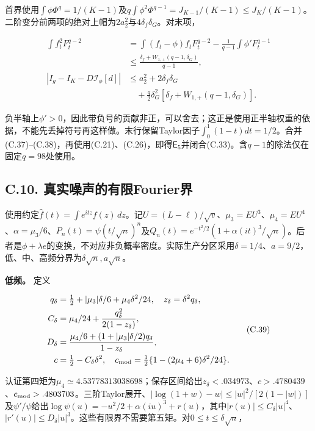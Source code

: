 \documentclass[11pt,a4paper]{article}
\begin{document}
首界使用\(\int\phi\Phi^q=1/(K-1)\)及\(q\int\phi^2\Phi^{q-1}=J_{K-1}/(K-1)\le J_K/(K-1)\)。二阶变分前两项的绝对上帽为\(2a_2^2\)与\(4\delta_f\delta_G\)。对末项，

\[
\begin{aligned}
\int f_t^2F_t^{q-2}
&=\int(f_t-\phi)f_tF_t^{q-2}-\frac1{q-1}\int\phi'F_t^{q-1}\\
&\le\frac{\delta_f+W_{1,+}(q-1,\delta_G)}{q-1},\\
|I_g-I_K-D\mathcal I_\phi[d]|
&\le a_2^2+2\delta_f\delta_G\\
&\quad+\frac q2\delta_G^2[\delta_f+W_{1,+}(q-1,\delta_G)].
\end{aligned}
\tag{C.38}
\]

负半轴上\(\phi'>0\)，因此带负号的贡献非正，可以舍去；这正是使用正半轴权重的依据，不能先丢掉符号再这样做。末行保留Taylor因子\(\int_0^1(1-t)dt=1/2\)。合并(C.37)--(C.38)，再使用(C.21)、(C.26)，即得\(\mathsf E_5\)并闭合(C.33)。含\(q-1\)的除法仅在固定\(q=98\)处使用。

\subsection*{C.10.
真实噪声的有限Fourier界}\label{c.10.-ux771fux5b9eux566aux58f0ux7684ux6709ux9650fourierux754c}

使用约定\(\widehat f(t)=\int e^{itz}f(z)\,dz\)。记\(U=(L-\ell)/\sqrt v\)、\(\mu_3=EU^3\)、\(\mu_4=EU^4\)、\(\alpha=\mu_3/6\)、\(P_n(t)=\psi(t/\sqrt n)^n\)及\(Q_n(t)=e^{-t^2/2}(1+\alpha(it)^3/\sqrt n)\)。后者是\(\phi+\lambda e\)的变换，不对应非负概率密度。实际生产分区采用\(\delta=1/4\)、\(a=9/2\)，低、中、高频分界为\(\delta\sqrt n,a\sqrt n\)。

\textbf{低频。} 定义

\[
\begin{aligned}
q_\delta&=\tfrac12+|\mu_3|\delta/6+\mu_4\delta^2/24,
\quad z_\delta=\delta^2q_\delta,\\
C_\delta&=\mu_4/24+\frac{q_\delta^2}{2(1-z_\delta)},\\
D_\delta&=\frac{\mu_4/6+(1+|\mu_3|\delta/2)q_\delta}{1-z_\delta},\\
c&=\tfrac12-C_\delta\delta^2,\quad
c_{\rm mod}=\tfrac12\{1-(2\mu_4+6)\delta^2/24\}.
\end{aligned}
\tag{C.39}
\]

认证第四矩为\(\mu_4\simeq4.53778313038698\)；保存区间给出\(z_\delta<.034973\)、\(c>.4780439\)、\(c_{\rm mod}>.4803703\)。三阶Taylor展开、\(|\log(1+w)-w|\le |w|^2/[2(1-|w|)]\)及\(\psi'/\psi\)给出\(\log\psi(u)=-u^2/2+\alpha(iu)^3+r(u)\)，其中\(|r(u)|\le C_\delta|u|^4\)、\(|r'(u)|\le D_\delta|u|^3\)。这些有限界不需要第五矩。对\(0\le t\le\delta\sqrt n\)，
\end{document}
